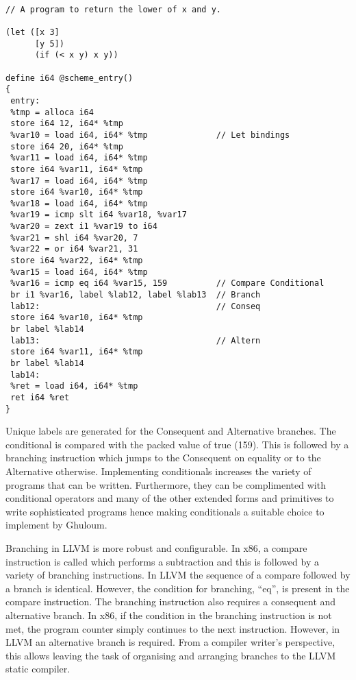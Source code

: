 \documentclass{article}
\begin{document}
\begingroup
    \fontsize{8pt}{5pt}\selectfont
\begin{verbatim}

// A program to return the lower of x and y. 

(let ([x 3] 
      [y 5])
      (if (< x y) x y))

define i64 @scheme_entry()
{
 entry: 
 %tmp = alloca i64
 store i64 12, i64* %tmp
 %var10 = load i64, i64* %tmp              // Let bindings
 store i64 20, i64* %tmp
 %var11 = load i64, i64* %tmp
 store i64 %var11, i64* %tmp
 %var17 = load i64, i64* %tmp
 store i64 %var10, i64* %tmp
 %var18 = load i64, i64* %tmp
 %var19 = icmp slt i64 %var18, %var17
 %var20 = zext i1 %var19 to i64
 %var21 = shl i64 %var20, 7
 %var22 = or i64 %var21, 31
 store i64 %var22, i64* %tmp
 %var15 = load i64, i64* %tmp
 %var16 = icmp eq i64 %var15, 159          // Compare Conditional
 br i1 %var16, label %lab12, label %lab13  // Branch
 lab12:                                    // Conseq
 store i64 %var10, i64* %tmp 
 br label %lab14                           
 lab13:                                    // Altern
 store i64 %var11, i64* %tmp 
 br label %lab14 
 lab14:
 %ret = load i64, i64* %tmp  
 ret i64 %ret
}
\end{verbatim}
\endgroup

Unique labels are generated for the Consequent and Alternative branches. The conditional is compared with the packed value of true (159). This is followed by a branching instruction which jumps to the Consequent on equality or to the Alternative otherwise. Implementing conditionals increases the variety of programs that can be written. Furthermore, they can be complimented with conditional operators and many of the other extended forms and primitives to write sophisticated programs hence making conditionals a suitable choice to implement by Ghuloum.

Branching in LLVM is more robust and configurable. In x86, a compare instruction is called which performs a subtraction and this is followed by a variety of branching instructions. In LLVM the sequence of a compare followed by a branch is identical. However, the condition for branching, ``eq'', is present in the compare instruction. The branching instruction also requires a consequent and alternative branch. In x86, if the condition in the branching instruction is not met, the program counter simply continues to the next instruction. However, in LLVM an alternative branch is required. From a compiler writer's perspective, this allows leaving the task of organising and arranging branches to the LLVM static compiler.
\end{document}
